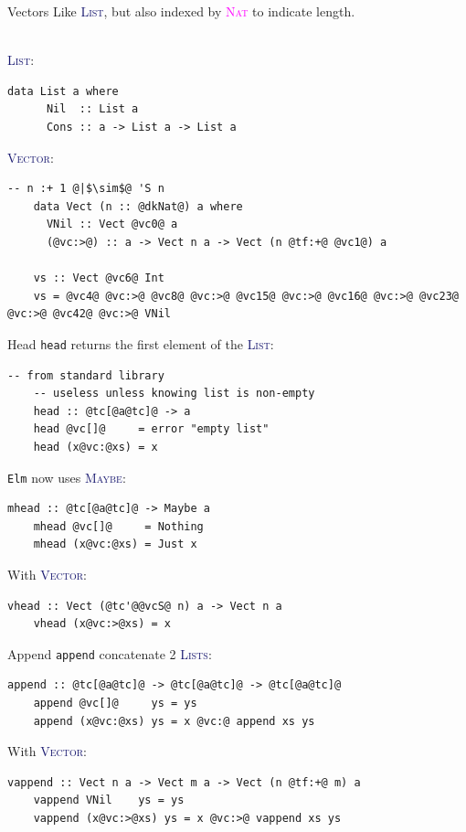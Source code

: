 \documentclass[xcolor={usenames,dvipsnames}]{beamer}
\newcommand{\htycon}[1]{\textcolor{MidnightBlue}{\textsc{#1}}}
\newcommand{\hkind}[1]{\textcolor{Fuchsia}{\textsc{#1}}}
\begin{document}
\begin{frame}[fragile]{Vectors}
  Like \htycon{List}, but also indexed by \hkind{Nat} to indicate length.

  \ \\
  \pause
  \htycon{List}:
  \begin{lstlisting}[style=hask]
    data List a where
      Nil  :: List a
      Cons :: a -> List a -> List a
  \end{lstlisting}

  \pause
  \htycon{Vector}:
  \begin{lstlisting}[style=hask]
    -- n :+ 1 @|$\sim$@ 'S n
    data Vect (n :: @dkNat@) a where
      VNil :: Vect @vc0@ a
      (@vc:>@) :: a -> Vect n a -> Vect (n @tf:+@ @vc1@) a

    vs :: Vect @vc6@ Int
    vs = @vc4@ @vc:>@ @vc8@ @vc:>@ @vc15@ @vc:>@ @vc16@ @vc:>@ @vc23@ @vc:>@ @vc42@ @vc:>@ VNil
  \end{lstlisting}
\end{frame}

\begin{frame}[fragile]{Head}
  \texttt{head} returns the first element of the \htycon{List}:
  \begin{lstlisting}[style=hask]
    -- from standard library
    -- useless unless knowing list is non-empty
    head :: @tc[@a@tc]@ -> a
    head @vc[]@     = error "empty list"
    head (x@vc:@xs) = x
  \end{lstlisting}

  \pause
  \texttt{Elm} now uses \htycon{Maybe}:
  \begin{lstlisting}[style=hask]
    mhead :: @tc[@a@tc]@ -> Maybe a
    mhead @vc[]@     = Nothing
    mhead (x@vc:@xs) = Just x
  \end{lstlisting}

  \pause
  With \htycon{Vector}:
  \begin{lstlisting}[style=hask]
    vhead :: Vect (@tc'@@vcS@ n) a -> Vect n a
    vhead (x@vc:>@xs) = x
  \end{lstlisting}
\end{frame}

\begin{frame}[fragile]{Append}
  \texttt{append} concatenate 2 \htycon{Lists}:
  \begin{lstlisting}[style=hask]
    append :: @tc[@a@tc]@ -> @tc[@a@tc]@ -> @tc[@a@tc]@
    append @vc[]@     ys = ys
    append (x@vc:@xs) ys = x @vc:@ append xs ys
  \end{lstlisting}

  \pause
  With \htycon{Vector}:
  \begin{lstlisting}[style=hask]
    vappend :: Vect n a -> Vect m a -> Vect (n @tf:+@ m) a
    vappend VNil    ys = ys
    vappend (x@vc:>@xs) ys = x @vc:>@ vappend xs ys
  \end{lstlisting}
\end{frame}
\end{document}
